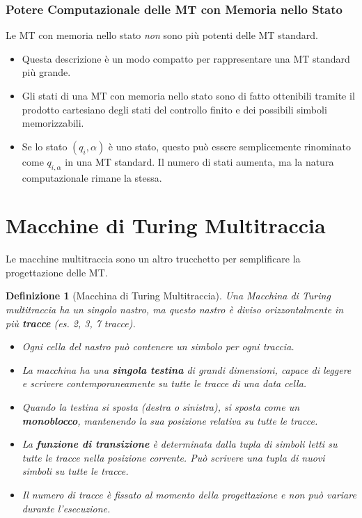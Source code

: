 \documentclass[a4paper, 11pt]{book} %
\newtheorem{definition}[theorem]{Definizione}
\theoremstyle{definition}
\begin{document}
\subsubsection{Potere Computazionale delle MT con Memoria nello Stato}
Le MT con memoria nello stato \emph{non} sono più potenti delle MT standard.
\begin{itemize}
    \item Questa descrizione è un modo compatto per rappresentare una MT standard più grande.
    \item Gli stati di una MT con memoria nello stato sono di fatto ottenibili tramite il prodotto cartesiano degli stati del controllo finito e dei possibili simboli memorizzabili.
    \item Se lo stato $(q_i, \alpha)$ è uno stato, questo può essere semplicemente rinominato come $q_{i,\alpha}$ in una MT standard. Il numero di stati aumenta, ma la natura computazionale rimane la stessa.
\end{itemize}

\section{Macchine di Turing Multitraccia}
Le macchine multitraccia sono un altro trucchetto per semplificare la progettazione delle MT.

\begin{definition}[Macchina di Turing Multitraccia]
Una Macchina di Turing multitraccia ha un singolo nastro, ma questo nastro è diviso orizzontalmente in più \textbf{tracce} (es. 2, 3, 7 tracce).
\begin{itemize}
    \item Ogni cella del nastro può contenere un simbolo per ogni traccia.
    \item La macchina ha una \textbf{singola testina} di grandi dimensioni, capace di leggere e scrivere contemporaneamente su tutte le tracce di una data cella.
    \item Quando la testina si sposta (destra o sinistra), si sposta come un \textbf{monoblocco}, mantenendo la sua posizione relativa su tutte le tracce.
    \item La \textbf{funzione di transizione} è determinata dalla tupla di simboli letti su tutte le tracce nella posizione corrente. Può scrivere una tupla di nuovi simboli su tutte le tracce.
    \item Il numero di tracce è fissato al momento della progettazione e non può variare durante l'esecuzione.
\end{itemize}
\end{definition}
\end{document}

